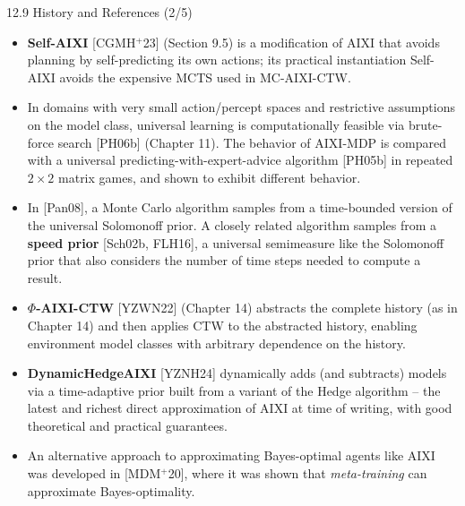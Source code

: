 \documentclass[aspectratio=169,10pt]{beamer}
\begin{document}
\begin{frame}[allowframebreaks]{12.9 History and References (2/5)}
\small
\begin{itemize}
\item \textbf{Self-AIXI} [CGMH$^+$23] (Section 9.5) is a modification of AIXI that avoids
planning by self-predicting its own actions; its practical instantiation Self-AIXI avoids
the expensive MCTS used in MC-AIXI-CTW.
\item In domains with very small action/percept spaces and restrictive assumptions on the
model class, universal learning is computationally feasible via brute-force search
[PH06b] (Chapter 11). The behavior of AIXI-MDP is compared with a universal
predicting-with-expert-advice algorithm [PH05b] in repeated $2\times2$ matrix games, and
shown to exhibit different behavior.
\item In [Pan08], a Monte Carlo algorithm samples from a time-bounded version of the
universal Solomonoff prior. A closely related algorithm samples from a \textbf{speed
prior} [Sch02b, FLH16], a universal semimeasure like the Solomonoff prior that also
considers the number of time steps needed to compute a result.
\item \textbf{$\Phi$-AIXI-CTW} [YZWN22] (Chapter 14) abstracts the complete history (as in
Chapter 14) and then applies CTW to the abstracted history, enabling environment model
classes with arbitrary dependence on the history.
\item \textbf{DynamicHedgeAIXI} [YZNH24] dynamically adds (and subtracts) models via a
time-adaptive prior built from a variant of the Hedge algorithm -- the latest and richest
direct approximation of AIXI at time of writing, with good theoretical and practical
guarantees.
\item An alternative approach to approximating Bayes-optimal agents like AIXI was
developed in [MDM$^+$20], where it was shown that \emph{meta-training} can approximate
Bayes-optimality.
\end{itemize}
\end{frame}
\end{document}

